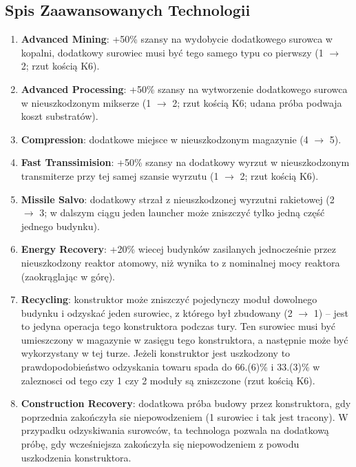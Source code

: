 \documentclass[11pt,a4paper]{article}
\begin{document}
\subsection{Spis Zaawansowanych Technologii}
\begin{enumerate}
\item \textbf{Advanced Mining}: +50\% szansy na wydobycie dodatkowego surowca w kopalni, dodatkowy surowiec musi być tego samego typu co pierwszy (1 $\to$ 2; rzut kością K6).
\item \textbf{Advanced Processing}: +50\% szansy na wytworzenie dodatkowego surowca w nieuszkodzonym mikserze (1 $\to$ 2; rzut kością K6; udana próba podwaja koszt substratów).
\item \textbf{Compression}: dodatkowe miejsce w nieuszkodzonym magazynie (4 $\to$ 5).
\item \textbf{Fast Transsimision}: +50\% szansy na dodatkowy wyrzut w nieuszkodzonym transmiterze przy tej samej szansie wyrzutu (1 $\to$ 2; rzut kością K6).
\item \textbf{Missile Salvo}: dodatkowy strzał z nieuszkodzonej wyrzutni rakietowej (2 $\to$ 3; w dalszym ciągu jeden launcher może zniszczyć tylko jedną część jednego budynku).
\item \textbf{Energy Recovery}: +20\% wiecej budynków zasilanych jednocześnie przez nieuszkodzony reaktor atomowy, niż wynika to z nominalnej mocy reaktora (zaokrąglając w górę).
\item \textbf{Recycling}: konstruktor może zniszczyć pojedynczy moduł dowolnego budynku i odzyskać jeden surowiec, z którego był zbudowany (2 $\to$ 1) -- jest to jedyna operacja tego konstruktora podczas tury. Ten surowiec musi być umieszczony w magazynie w zasięgu tego konstruktora, a następnie może być wykorzystany w tej turze. Jeżeli konstruktor jest uszkodzony to prawdopodobieństwo odzyskania towaru spada do 66.(6)\% i 33.(3)\% w zaleznosci od tego czy 1 czy 2 moduły są zniszczone (rzut kością K6).
\item \textbf{Construction Recovery}: dodatkowa próba budowy przez konstruktora, gdy poprzednia zakończyła sie niepowodzeniem (1 surowiec i tak jest tracony). W przypadku odzyskiwania surowców, ta technologa pozwala na dodatkową próbę, gdy wcześniejsza zakończyła się niepowodzeniem z powodu uszkodzenia konstruktora. 
\end{enumerate}
\end{document}
